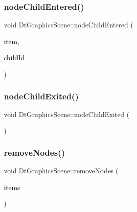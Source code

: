 \mbox{\label{class_dt_graphics_scene_a0864c9ffbae4f81223173131194efa49}} 
\subsubsection{\texorpdfstring{nodeChildEntered()}{nodeChildEntered()}}
{\footnotesize\ttfamily void Dt\+Graphics\+Scene\+::node\+Child\+Entered (\begin{DoxyParamCaption}\item[{\mbox{\hyperlink{class_graph_node_item}{Graph\+Node\+Item}} $\ast$}]{item,  }\item[{int}]{child\+Id }\end{DoxyParamCaption})}

\mbox{\label{class_dt_graphics_scene_a8276855fdb1369e62504f559cb519877}} 
\subsubsection{\texorpdfstring{nodeChildExited()}{nodeChildExited()}}
{\footnotesize\ttfamily void Dt\+Graphics\+Scene\+::node\+Child\+Exited (\begin{DoxyParamCaption}{ }\end{DoxyParamCaption})}

\mbox{\label{class_dt_graphics_scene_a5a87dbd9ad60029387bfcef34b299034}} 
\subsubsection{\texorpdfstring{removeNodes()}{removeNodes()}}
{\footnotesize\ttfamily void Dt\+Graphics\+Scene\+::remove\+Nodes (\begin{DoxyParamCaption}\item[{Q\+List$<$ \mbox{\hyperlink{class_graph_node_item}{Graph\+Node\+Item}} $\ast$ $>$}]{items }\end{DoxyParamCaption})}

